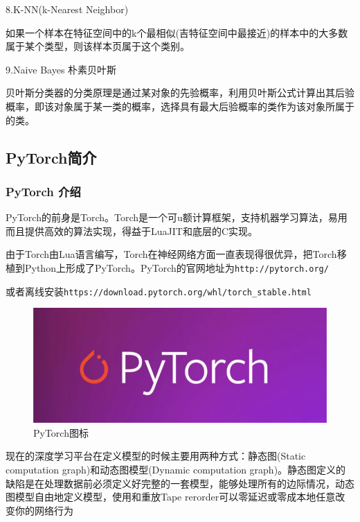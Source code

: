 \documentclass[openbib]{article}
\begin{document}
	\begin{center}
		8.K-NN(k-Nearest Neighbor)
	\end{center}

	如果一个样本在特征空间中的k个最相似(吉特征空间中最接近)的样本中的大多数属于某个类型，则该样本页属于这个类别。
	
	\begin{center}
		9.Naive Bayes 朴素贝叶斯
	\end{center}

	贝叶斯分类器的分类原理是通过某对象的先验概率，利用贝叶斯公式计算出其后验概率，即该对象属于某一类的概率，选择具有最大后验概率的类作为该对象所属于的类。
	
	\subsection{PyTorch简介}
	\subsubsection{PyTorch 介绍}
	
	PyTorch的前身是Torch。Torch是一个可u额计算框架，支持机器学习算法，易用而且提供高效的算法实现，得益于LuaJIT和底层的C实现。
	
	由于Torch由Lua语言编写，Torch在神经网络方面一直表现得很优异，把Torch移植到Python上形成了PyTorch。PyTorch的官网地址为\texttt{http://pytorch.org/}
	
	或者离线安装\texttt{https://download.pytorch.org/whl/torch\_stable.html}
	
		\begin{figure}[htbp]
			\centering
			\includegraphics[scale=0.8]{PyTorch.jpg}
			\caption{PyTorch图标}
		\end{figure}
	现在的深度学习平台在定义模型的时候主要用两种方式：静态图(Static computation graph)和动态图模型(Dynamic computation graph)。静态图定义的缺陷是在处理数据前必须定义好完整的一套模型，能够处理所有的边际情况，动态图模型自由地定义模型，使用和重放Tape rerorder可以零延迟或零成本地任意改变你的网络行为
	
\end{document}
